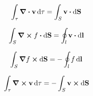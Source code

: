 
\begin{equation}
\label{app:eqn:teo_div}
    \int_\tau \div{\vb{v}}\dd{\tau}=\int_S \vb{v}\vdot\dd{\vb{S}}
\end{equation}

\begin{equation}
\label{app:eqn:teo_stokes}
    \int_S \curl{f}\vdot\dd{\vb{S}}=\oint_l \vb{v}\vdot\dd{\vb{l}}
\end{equation}

\begin{equation}
    \int_S \grad{f}\cp\dd{\vb{S}}=-\oint_l f\dd{\vb{l}}
\end{equation}

\begin{equation}
\label{app:eqn:seconda_green}
    \int_\tau \curl{\vb{v}}\dd{\tau}=-\int_S \vb{v}\cp\dd{\vb{S}}
\end{equation}
